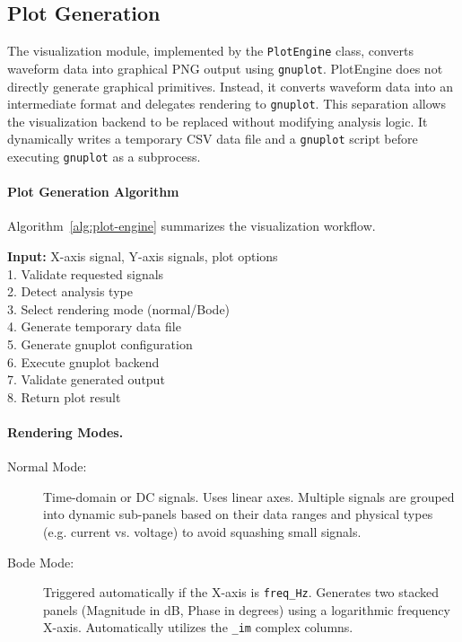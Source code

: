 \subsection{Plot Generation}
\label{sec:pp-plot}

The visualization module, implemented by the \texttt{PlotEngine} class, converts waveform data into graphical PNG output using \texttt{gnuplot}. PlotEngine does not directly generate graphical primitives. Instead, it converts waveform data into an intermediate format and delegates rendering to \texttt{gnuplot}. This separation allows the visualization backend to be replaced without modifying analysis logic. It dynamically writes a temporary CSV data file and a \texttt{gnuplot} script before executing \texttt{gnuplot} as a subprocess.
\newpage

\paragraph{Plot Generation Algorithm}

Algorithm~\ref{alg:plot-engine} summarizes the visualization workflow.

\begin{algorithm}[H]
\caption{GeneratePlot}
\label{alg:plot-engine}
\textbf{Input:} X-axis signal, Y-axis signals, plot options\\

1. Validate requested signals\\
2. Detect analysis type\\
3. Select rendering mode (normal/Bode)\\
4. Generate temporary data file\\
5. Generate gnuplot configuration\\
6. Execute gnuplot backend\\
7. Validate generated output\\
8. Return plot result
\end{algorithm}

\paragraph{Rendering Modes.}
\begin{description}
  \item[Normal Mode:] Time-domain or DC signals. Uses linear axes. Multiple signals are grouped into dynamic sub-panels based on their data ranges and physical types (e.g. current vs. voltage) to avoid squashing small signals.
  \item[Bode Mode:] Triggered automatically if the X-axis is \texttt{freq\_Hz}. Generates two stacked panels (Magnitude in dB, Phase in degrees) using a logarithmic frequency X-axis. Automatically utilizes the \texttt{\_im} complex columns.
\end{description}


